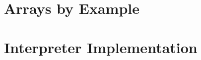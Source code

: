 \documentclass[12pt]{article}
\begin{document}

\clearpage

\tableofcontents
\clearpage


\clearpage


\clearpage

\section{Arrays by Example}
\clearpage


\clearpage


\clearpage

\section{Interpreter Implementation}
\clearpage

\printbibliography
\clearpage

\appendix

\clearpage


\end{document}
